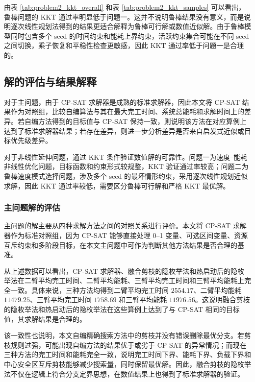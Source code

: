 由表 \ref{tab:problem2_kkt_overall} 和表 \ref{tab:problem2_kkt_samples} 可以看出，鲁棒问题的 KKT 通过率明显低于问题一。这并不说明鲁棒结果没有意义，而是说明逐次线性规划法得到的结果更适合解释为鲁棒可行解或数值近似解。由于鲁棒模型同时包含多个 seed 的时间约束和能耗上界约束，活跃约束集合可能在不同 seed 之间切换，乘子恢复和平稳性检查更敏感，因此 KKT 通过率低于问题一是合理的。


\subsection{解的评估与结果解释}

对于主问题，由于 CP-SAT 求解器是成熟的标准求解器，因此本文将 CP-SAT 结果作为对照组，比较自编算法与其在最大完工时间、系统总能耗和求解时间上的差异。若自编方法得到的目标值与 CP-SAT 保持一致，则说明该方法在对应算例上达到了标准求解器结果；若存在差异，则进一步分析差异是否来自启发式近似或目标优先级差异。

对于非线性延伸问题，通过 KKT 条件验证数值解的可靠性。问题一为速度--能耗非线性优化问题，目标函数和约束形式较规整，KKT 验证通过率较高；问题二为鲁棒速度模式选择问题，涉及多个 seed 的最坏情形约束，采用逐次线性规划近似求解，因此 KKT 通过率较低，需要区分鲁棒可行解和严格 KKT 最优解。

\subsubsection{主问题解的评估}

主问题的解主要从四种求解方法之间的对照关系进行评价。本文将 CP-SAT 求解器作为标准对照组，因为 CP-SAT 能够直接处理 0--1 变量、可选区间变量、资源互斥约束和多阶段目标，在本文主问题中可作为判断其他方法结果是否合理的基准。

从上述数据可以看出，CP-SAT 求解器、融合剪枝的隐枚举法和热启动后的隐枚举法在二臂平均完工时间、二臂平均能耗、三臂平均完工时间和三臂平均能耗上完全一致。具体来说，三种方法均得到二臂平均完工时间 $2554.17$、二臂平均能耗 $11479.25$、三臂平均完工时间 $1758.69$ 和三臂平均能耗 $11976.56$。这说明融合剪枝的隐枚举法和热启动后的隐枚举法在这些算例上达到了与 CP-SAT 相同的目标值，其求解结果是合理的。

该一致性也说明，本文自编精确搜索方法中的剪枝并没有错误删除最优分支。若剪枝规则过强，可能出现自编方法的结果优于或劣于 CP-SAT 的异常情况；而现在三种方法的完工时间和能耗完全一致，说明完工时间下界、能耗下界、负载下界和中心安全区互斥剪枝能够减少搜索量，同时保留最优解。因此，融合剪枝的隐枚举法不仅在逻辑上符合分支定界思想，在数值结果上也得到了标准求解器的验证。

